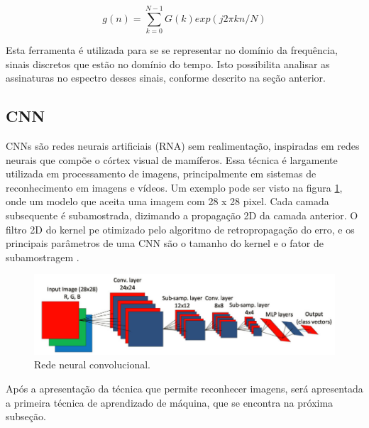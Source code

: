 \begin{equation}\label{eq:dft}
    g(n)=\sum_{k=0}^{N-1} G(k)exp(j2\pi kn/N)
\end{equation}

Esta ferramenta é utilizada para se se representar no domínio da frequência, sinais discretos que estão no domínio do tempo. Isto 
possibilita analisar as assinaturas no espectro desses sinais, conforme descrito na seção anterior.


% 

\subsection{CNN}

CNNs são redes neurais artificiais (RNA) sem realimentação, inspiradas em redes neurais que compõe o córtex visual de mamíferos. Essa
técnica é largamente utilizada em processamento de imagens, principalmente em sistemas de reconhecimento em imagens e vídeos. Um exemplo
pode ser visto na figura \ref{fig:cnn_image_ince_p5}, onde um modelo que aceita uma imagem com 28 x 28 pixel. Cada camada subsequente é
subamostrada, dizimando a propagação 2D da camada anterior. O filtro 2D do kernel pe otimizado pelo algoritmo de retropropagação do erro, 
e os principais parâmetros de uma CNN são o tamanho do kernel e o fator de subamostragem \cite{Ince2016}.

\begin{figure}[H]
    \caption{Rede neural convolucional.}
    \begin{center}
        \includegraphics[scale=.4]{referencial/img/cnn_image_ince_p5.png}
    \end{center}
    \label{fig:cnn_image_ince_p5}
\end{figure}

Após a apresentação da técnica que permite reconhecer imagens, será apresentada a primeira técnica de aprendizado de máquina, que se
encontra na próxima subseção.


